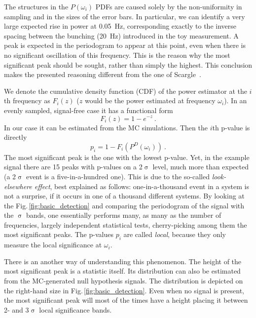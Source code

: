 The structures in the $P(\omega_i)$ PDFs are caused solely by the non-uniformity in sampling and in the sizes of the error bars. In particular, we can identify a very large expected rise in power at \SI{0.05}{\hertz}, corresponding exactly to the inverse spacing between the bunching (\SI{20}{\hertz}) introduced in the toy measurement. A peak is expected in the periodogram to appear at this point, even when there is no significant oscillation of this frequency. This is the reason why the most significant peak should be sought, rather than simply the highest. This conclusion makes the presented reasoning different from the one of Scargle~\cite{Scargle1982}.

We denote the cumulative density function (CDF) of the power estimator at the $i$th frequency as $F_i(z)$ ($z$ would be the power estimated at frequency $\omega_i$). In an evenly sampled, signal-free case it has a functional form
\begin{equation}
  F_i(z) = 1 - e^{-z} \ .
\end{equation}
In our case it can be estimated from the MC simulations. Then the $i$th p-value is directly
\begin{equation} \label{eq:local_p_value}
  p_i = 1 - F_i\left( P^D(\omega_i) \right) \ .
\end{equation}
The most significant peak is the one with the lowest p-value. Yet, in the example signal there are 15 peaks with p-values on a 2$\upsigma$ level, much more than expected (a 2$\upsigma$ event is a five-in-a-hundred one). This is due to the so-called \emph{look-elsewhere effect}, best explained as follows: one-in-a-thousand event in a system is not a surprise, if it occurs in one of a thousand different systems. By looking at the Fig.\,\ref{fig:basic_detection} and comparing the periodogram of the signal with the $\upsigma$ bands, one essentially performs many, as many as the number of frequencies, largely independent statistical tests, cherry-picking among them the most significant peaks. The p-values $p_i$ are called \emph{local}, because they only measure the local significance at $\omega_i$.

There is an another way of understanding this phenomenon. The height of the most significant peak is a statistic itself. Its distribution can also be estimated from the MC-generated null hypothesis signals. The distribution is depicted on the right-hand size in Fig.\,\ref{fig:basic_detection}. Even when no signal is present, the most significant peak will most of the times have a height placing it between 2- and 3$\upsigma$ local significance bands.

